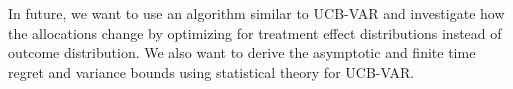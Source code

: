 \documentclass[12pt, letterpaper]{article}
\begin{document}
In future, we want to use an algorithm similar to UCB-VAR and investigate how the allocations change by optimizing for treatment effect distributions instead of outcome distribution. We also want to derive the asymptotic and finite time regret and variance bounds using statistical theory for UCB-VAR.

\newpage

\end{document}
